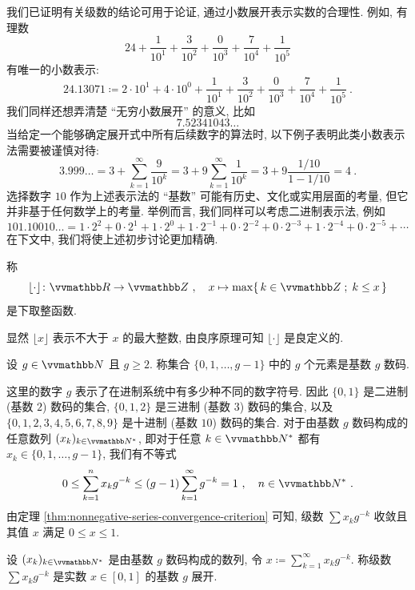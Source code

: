 我们已证明有关级数的结论可用于论证, 通过小数展开表示实数的合理性. 例如, 有理数
\[
    24 + \frac{1}{10^1} + \frac{3}{10^2} + \frac{0}{10^3} + \frac{7}{10^4} + \frac{1}{10^5}
\]
有唯一的小数表示:
\[
    24.13071 \coloneqq 2 \cdot 10^1 + 4 \cdot 10^0 + \frac{1}{10^1} + \frac{3}{10^2} + \frac{0}{10^3} + \frac{7}{10^4} + \frac{1}{10^5}\ .
\]
我们同样还想弄清楚 ``无穷小数展开'' 的意义, 比如
\[
    7.52341043 \ldots
\]
当给定一个能够确定展开式中所有后续数字的算法时, 以下例子表明此类小数表示法需要被谨慎对待:
\[
    3.999 \ldots = 3 + \sum_{k = 1}^\infty \frac{9}{10^k} = 3 + 9 \sum_{k = 1}^\infty \frac{1}{10^k} = 3 + 9 \frac{1 / 10}{1 - 1 / 10} = 4\ .
\]
选择数字 \(10\) 作为上述表示法的 ``基数'' 可能有历史、文化或实用层面的考量, 但它并非基于任何数学上的考量. 举例而言, 我们同样可以考虑二进制表示法, 例如
\[
    101.10010 \ldots = 1 \cdot 2^2 + 0 \cdot 2^1 + 1 \cdot 2^0 + 1 \cdot 2^{- 1} + 0 \cdot 2^{- 2} + 0 \cdot 2^{- 3} + 1 \cdot 2^{- 4} + 0 \cdot 2^{- 5} + \cdots
\]
在下文中, 我们将使上述初步讨论更加精确.

\begin{definition}[下取整函数]
    称
    \[
        \lfloor \cdot \rfloor \colon \R \to \Z\ ,\quad x \mapsto \max\{\, k \in \Z \;;\; k \leq x \,\}
    \]
    是下取整函数.
\end{definition}

显然 \(\lfloor x \rfloor\) 表示不大于 \(x\) 的最大整数, 由良序原理可知 \(\lfloor \cdot \rfloor\) 是良定义的.

\begin{definition}[基数 \(g\) 数码]
    设 \(g \in \N\) 且 \(g \geq 2\). 称集合 \(\{0, 1, \ldots, g - 1\}\) 中的 \(g\) 个元素是基数 \(g\) 数码.
\end{definition}

这里的数字 \(g\) 表示了在进制系统中有多少种不同的数字符号. 因此 \(\{0, 1\}\) 是二进制 (基数 \(2\)) 数码的集合, \(\{0, 1, 2\}\) 是三进制 (基数 \(3\)) 数码的集合, 以及 \(\{0, 1, 2, 3, 4, 5, 6, 7, 8, 9\}\) 是十进制 (基数 \(10\)) 数码的集合. 对于由基数 \(g\) 数码构成的任意数列 \((x_k)_{k \in \N^\ast}\), 即对于任意 \(k \in \N^\ast\) 都有 \(x_k \in \{0, 1, \ldots, g - 1\}\), 我们有不等式
\[
    0 \leq \sum_{k = 1}^n x_k g^{- k} \leq (g - 1) \sum_{k = 1}^\infty g^{- k} = 1\ ,\quad n \in \N^\ast\ .
\]
由定理 \ref{thm:nonnegative-series-convergence-criterion} 可知, 级数 \(\sum x_k g^{- k}\) 收敛且其值 \(x\) 满足 \(0 \leq x \leq 1\).

\begin{definition}[基数 \(g\) 展开]
    设 \((x_k)_{k \in \N^\ast}\) 是由基数 \(g\) 数码构成的数列, 令 \(x \coloneqq \sum_{k = 1}^\infty x_k g^{- k}\). 称级数 \(\sum x_k g^{- k}\) 是实数 \(x \in [0, 1]\) 的基数 \(g\) 展开.
\end{definition}

